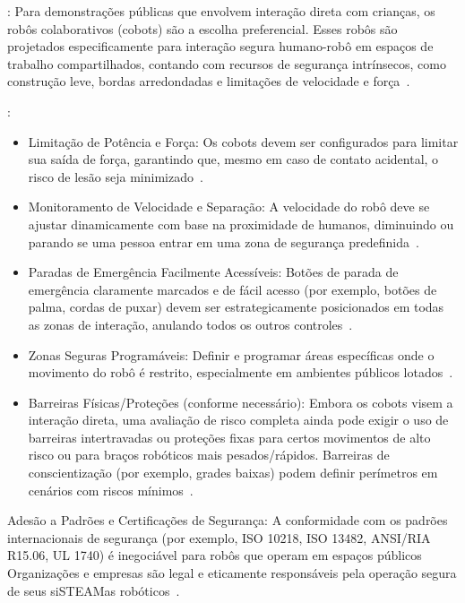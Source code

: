 \documentclass[%
  a4paper,%
  12pt,%
  fleqn,%
  english,%
  brazilian,%
]{article}
\begin{document}
	\begin{description}
		\item [Priorizar Robôs Colaborativos (Cobots)]: Para demonstrações públicas que envolvem interação direta com crianças, os robôs colaborativos (cobots) são a escolha preferencial. Esses robôs são projetados especificamente para interação segura humano-robô em espaços de trabalho compartilhados, contando com recursos de segurança intrínsecos, como construção leve, bordas arredondadas e limitações de velocidade e força~\cite{top3dshopDobotMagicianReview2023}.
		
		\item [Implementar Recursos Essenciais de Segurança]:
			\begin{itemize}
				\item Limitação de Potência e Força: Os cobots devem ser configurados para limitar sua saída de força, garantindo que, mesmo em caso de contato acidental, o risco de lesão seja minimizado~\cite{wikipediaCobot2025}.
				\item Monitoramento de Velocidade e Separação: A velocidade do robô deve se ajustar dinamicamente com base na proximidade de humanos, diminuindo ou parando se uma pessoa entrar em uma zona de segurança predefinida~\cite{wikipediaCobot2025}.
				\item Paradas de Emergência Facilmente Acessíveis: Botões de parada de emergência claramente marcados e de fácil acesso (por exemplo, botões de palma, cordas de puxar) devem ser estrategicamente posicionados em todas as zonas de interação, anulando todos os outros controles~\cite{kinovaJacoAssistiveTechnologies2025}.
				\item Zonas Seguras Programáveis: Definir e programar áreas específicas onde o movimento do robô é restrito, especialmente em ambientes públicos lotados~\cite{teradyneCollaborativeRobots2025}.
				\item Barreiras Físicas/Proteções (conforme necessário): Embora os cobots visem a interação direta, uma avaliação de risco completa ainda pode exigir o uso de barreiras intertravadas ou proteções fixas para certos movimentos de alto risco ou para braços robóticos mais pesados/rápidos. Barreiras de conscientização (por exemplo, grades baixas) podem definir perímetros em cenários com riscos mínimos~\cite{kinovaJacoAssistiveTechnologies2025}.
			\end{itemize}
		\item Adesão a Padrões e Certificações de Segurança: A conformidade com os padrões internacionais de segurança (por exemplo, ISO 10218, ISO 13482, ANSI/RIA R15.06, UL 1740) é inegociável para robôs que operam em espaços públicos~\cite{standardBotsCobotSafetyStandards2025} Organizações e empresas são legal e eticamente responsáveis pela operação segura de seus siSTEAMas robóticos~\cite{li2023LowCostCableDrivenArm}.

\end{description}
\end{document}

